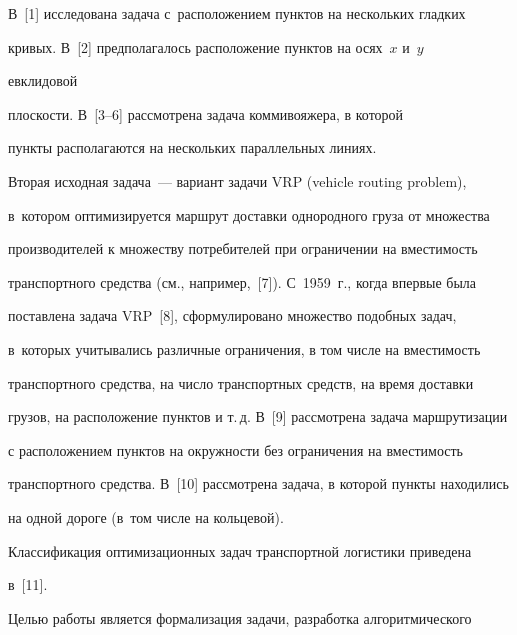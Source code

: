 В~[1] исследована задача с~расположением пунктов на нескольких гладких 


кривых. В~[2] предполагалось расположение пунктов на осях~$x$ и~$y$ 


евклидовой\linebreak\vspace*{-12pt}





\pagebreak





\noindent


 плоскости. В~[3--6] рассмотрена задача коммивояжера, в которой 


пункты располагаются на нескольких параллельных линиях.


  


  Вторая исходная задача~--- вариант задачи VRP (vehicle routing problem), 


в~котором оптимизируется маршрут доставки однородного груза от множества 


производителей к множеству потребителей при ограничении на вместимость 


транспортного средства (см., например,~[7]). С~1959~г., когда впервые была 


поставлена задача VRP~[8], сформулировано множество подобных задач, 


в~которых учитывались различные ограничения, в том числе на вместимость 


транспортного средства, на число транспортных средств, на время доставки 


грузов, на расположение пунктов и т.\,д. В~[9] рассмотрена задача маршрутизации 


с расположением пунктов на окружности без ограничения на вместимость 


транспортного средства. В~[10] рассмотрена задача, в которой пункты находились 


на одной дороге (в~том числе на кольцевой).




  Классификация оптимизационных задач транспортной логистики приведена 


в~[11].


  


  Целью работы является формализация задачи, разработка алгоритмического 


